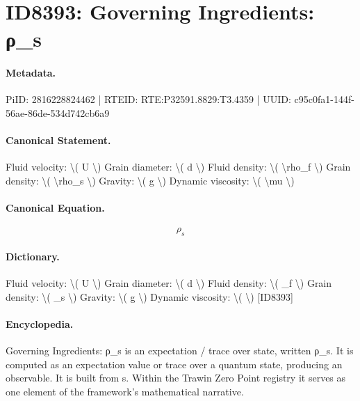 \section*{ID8393: Governing Ingredients: ρ\_s}
\paragraph{Metadata.}
PiID: 2816228824462 | RTEID: RTE:P32591.8829:T3.4359 | UUID: c95c0fa1-144f-56ae-86de-534d742cb6a9

\paragraph{Canonical Statement.}
Fluid velocity: \textbackslash{}( U \textbackslash{}) Grain diameter: \textbackslash{}( d \textbackslash{}) Fluid density: \textbackslash{}( \textbackslash{}rho\_f \textbackslash{}) Grain density: \textbackslash{}( \textbackslash{}rho\_s \textbackslash{}) Gravity: \textbackslash{}( g \textbackslash{}) Dynamic viscosity: \textbackslash{}( \textbackslash{}mu \textbackslash{})

\paragraph{Canonical Equation.}
\[
\rho_s
\]

\paragraph{Dictionary.}
Fluid velocity: \textbackslash{}( U \textbackslash{}) Grain diameter: \textbackslash{}( d \textbackslash{}) Fluid density: \textbackslash{}( \_f \textbackslash{}) Grain density: \textbackslash{}( \_s \textbackslash{}) Gravity: \textbackslash{}( g \textbackslash{}) Dynamic viscosity: \textbackslash{}( \textbackslash{}) [ID8393]

\paragraph{Encyclopedia.}
Governing Ingredients: ρ\_s is an expectation / trace over state, written ρ\_s. It is computed as an expectation value or trace over a quantum state, producing an observable. It is built from s. Within the Trawin Zero Point registry it serves as one element of the framework's mathematical narrative.
